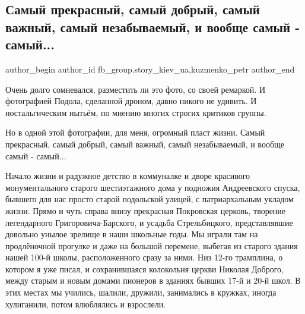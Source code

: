  
 
 
 
 
 
\subsection{Самый прекрасный, самый добрый, самый важный, самый незабываемый, и вообще самый - самый...}
\label{sec:10_12_2021.fb.fb_group.story_kiev_ua.2.samyj_samyj_podol}
 
\ifcmt
 author_begin
   author_id fb_group.story_kiev_ua,kuzmenko_petr
 author_end
\fi

Очень долго сомневался, разместить ли это фото, со своей ремаркой. И
фотографией Подола, сделанной дроном, давно никого не удивить. И
ностальгическим нытьём, по мнению многих строгих критиков группы. 

Но в одной этой фотографии, для меня, огромный пласт жизни. Самый прекрасный,
самый добрый, самый важный, самый незабываемый, и вообще самый - самый... 


Начало жизни и радужное детство в коммуналке и дворе красивого монументального
старого шестиэтажного дома у подножия Андреевского спуска, бывшего для нас
просто старой подольской улицей, с патриархальным укладом жизни. Прямо и чуть
справа внизу прекрасная Покровская церковь, творение легендарного
Григоровича-Барского, и усадьба Стрельбицкого, представлявшие довольно унылое
зрелище в наши школьные годы. Мы играли там на продлёночной прогулке и даже на
большой перемене, выбегая из старого здания нашей 100-й школы, расположенного
сразу за ними. Низ 12-го трамплина, о котором я уже писал, и сохранившаяся
колокольня церкви Николая Доброго, между старым и новым домами пионеров в
зданиях бывших 17-й и 20-й школ. В этих местах мы учились, шалили, дружили,
занимались в кружках, иногда хулиганили, потом влюблялись и взрослели. 

